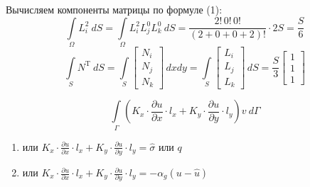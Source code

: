 \documentclass{bmstu}
\begin{document}
	Вычисляем компоненты матрицы по формуле (1):
	\[
	\int\limits_{\Omega} L_i^2 \ dS = \int\limits_{\Omega} L_i^2L_j^0L_k^0 \ dS=  \dfrac{2!\, 0!\, 0!}{(2+0+0+2)!}\cdot 2S=\frac{S}{6}
	\]
	\[
	\int\limits_SN^{\text{T}} \ dS = \int\limits_S \begin{bmatrix}
		N_i \\ N_j \\ N_k
	\end{bmatrix} \, dxdy = \int\limits_S \begin{bmatrix}
	L_i \\ L_j \\ L_k
	\end{bmatrix} \, dS = \frac{S}{3} \begin{bmatrix}
	1 \\ 1 \\ 1
	\end{bmatrix}
	\]
	
	\[
	\int\limits_{\Gamma} \left(K_x \cdot  \frac{\partial u}{\partial x} \cdot l_x + K_y \cdot  \frac{\partial u}{\partial y} \cdot l_y \right)v\ d\Gamma 
	\]
	\begin{enumerate}
		\item или $K_x \cdot  \frac{\partial u}{\partial x} \cdot l_x + K_y \cdot  \frac{\partial u}{\partial y} \cdot l_y=\hat\sigma$ или $q$ 
		\item или $K_x \cdot  \frac{\partial u}{\partial x} \cdot l_x + K_y \cdot  \frac{\partial u}{\partial y} \cdot l_y=-\alpha_g(u-\hat u)$ 
	\end{enumerate}
	
\end{document}
